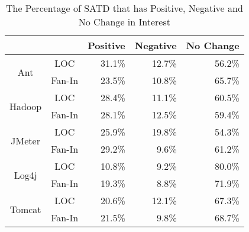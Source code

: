 \begin{table}[tb]
  \caption{The Percentage of SATD that has Positive, Negative and No Change in Interest}
  \label{tab:percentage}
  \centering

  \begin{tabular}{cc|rrr}
  \hline
        & & \textbf{Positive} & \textbf{Negative} & \textbf{No Change} \\
  \hline
\multirow{2}{*}{Ant} &  LOC  &  31.1\%  &  12.7\% & 56.2\%\\
                   & Fan-In  &  23.5\%  &  10.8\% & 65.7\%\\
  \hline
\multirow{2}{*}{Hadoop} &  LOC  &  28.4\%  &  11.1\% & 60.5\%\\
                      & Fan-In  &  28.1\%  &  12.5\% & 59.4\%\\
  \hline
\multirow{2}{*}{JMeter} &  LOC  &  25.9\%  &  19.8\% & 54.3\%\\
                      & Fan-In  &  29.2\%  &  9.6\% & 61.2\%\\
  \hline
\multirow{2}{*}{Log4j} &  LOC  &  10.8\%  &  9.2\% & 80.0\%\\
                     & Fan-In  &  19.3\%  &  8.8\% & 71.9\%\\
  \hline
\multirow{2}{*}{Tomcat} &  LOC &  20.6\%  &  12.1\% & 67.3\%\\
                      & Fan-In &  21.5\%  &  9.8\% & 68.7\%\\
  \hline
  \end{tabular}
\end{table}